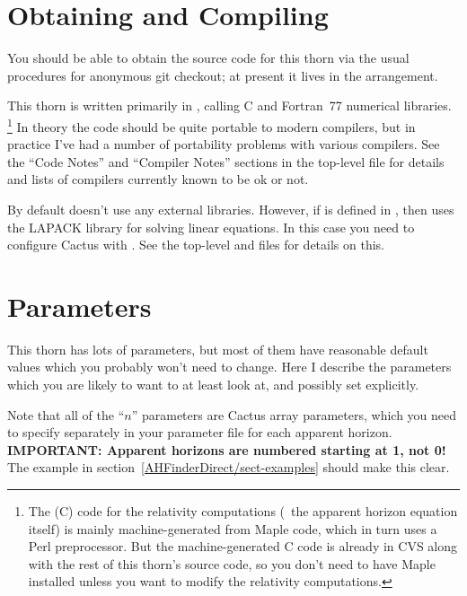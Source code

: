 
\section{Obtaining and Compiling }

You should be able to obtain the source code for this thorn via the
usual procedures for anonymous git checkout; at present it lives in
the  arrangement.

This thorn is written primarily in \Cplusplus{}, calling C and
Fortran~77 numerical libraries.%
\footnote{%
	 The (C) code for the relativity computations
	 (\ie{}~the apparent horizon equation itself)
	 is mainly machine-generated from Maple code,
	 which in turn uses a Perl preprocessor.
	 But the machine-generated C code is already
	 in CVS along with the rest of this thorn's
	 source code, so you don't need to have Maple
	 installed unless you want to modify the
	 relativity computations.%
	 }%
{}  In theory the code should be quite portable to modern \Cplusplus{}
compilers, but in practice I've had a number of portability problems
with various compilers.  See the ``Code Notes'' and ``Compiler Notes''
sections in the top-level  file for details and lists of
compilers currently known to be ok or not.

By default  doesn't use any external libraries.
However, if  is defined in
, then  uses the
LAPACK library for solving linear equations.  In this case you need
to configure Cactus with .  See the top-level
 and  files for details on this.


\section{ Parameters}

This thorn has lots of parameters, but most of them have reasonable
default values which you probably won't need to change.  Here I describe
the parameters which you are likely to want to at least look at, and
possibly set explicitly.

Note that all of the ``\code{[}$n$\code{]}'' parameters are Cactus
array parameters, which you need to specify separately in your parameter
file for each apparent horizon.  {\bf IMPORTANT: Apparent horizons are
numbered starting at 1, not 0!}  The example in
section~\ref{AHFinderDirect/sect-examples} should make this clear.

